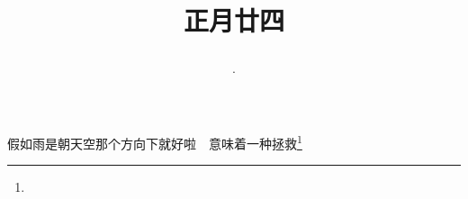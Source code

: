 \title{\date[d=4,m=3,y=2024][year:cn-y,年,month:cn,day:cn,日,·,weekday]·正月廿四 }
假如雨是朝天空那个方向下就好啦　意味着一种拯救\footnote{ }

